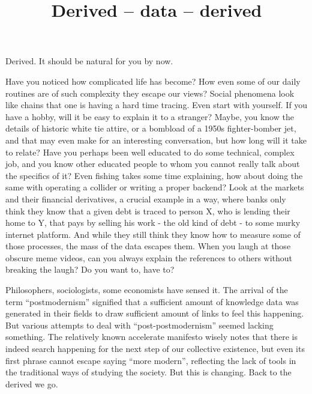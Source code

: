 \documentclass{article}
\title{Derived -- data -- derived}
\author{}
\begin{document}
\thispagestyle{empty}

\maketitle

\noindent Derived. It should be natural for you by now.

Have you noticed how complicated life has become? How even some of our daily routines are of such complexity they escape our views? Social phenomena look like chains that one is having a hard time tracing. Even start with yourself. If you have a hobby, will it be easy to explain it to a stranger? Maybe, you know the details of historic white tie attire, or a bombload of a 1950s fighter-bomber jet, and that may even make for an interesting conversation, but how long will it take to relate? Have you perhaps been well educated to do some technical, complex job, and you know other educated people to whom you cannot really talk about the specifics of it? Even fishing takes some time explaining, how about doing the same with operating a collider or writing a proper backend? Look at the markets and their financial derivatives, a crucial example in a way, where banks only think they know that a given debt is traced to person X, who is lending their home to Y, that pays by selling his work - the old kind of debt - to some murky internet platform. And while they still think they know how to measure some of those processes, the mass of the data escapes them. When you laugh at those obscure meme videos, can you always explain the references to others without breaking the laugh? Do you want to, have to?

Philosophers, sociologists, some economists have sensed it. The arrival of the term “postmodernism” signified that a sufficient amount of knowledge data was generated in their fields to draw sufficient amount of links to feel this happening. But various attempts to deal with “post-postmodernism” seemed lacking something. The relatively known accelerate manifesto wisely notes that there is indeed search happening for the next step of our collective existence, but even its first phrase cannot escape saying “more modern”, reflecting the lack of tools in the traditional ways of studying the society. But this is changing. Back to the derived we go.
\end{document}

